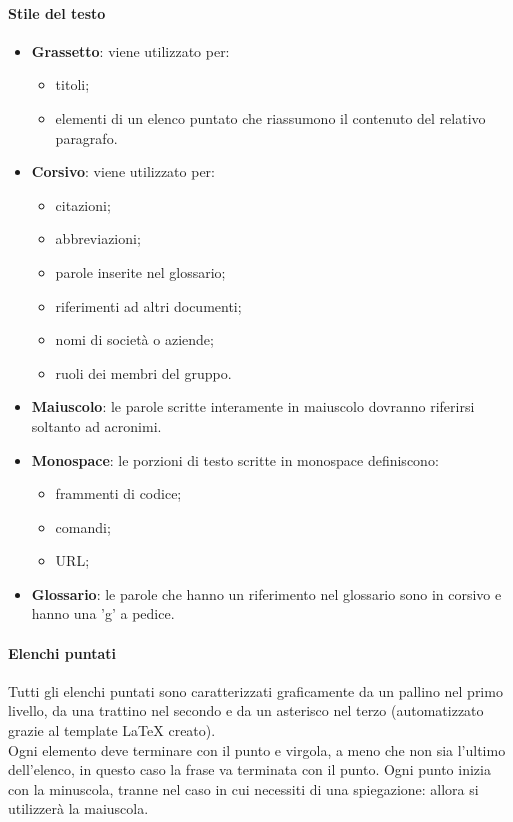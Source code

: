  \paragraph{Stile del testo} 
\begin{itemize}
	\item \textbf{Grassetto}: viene utilizzato per:
	\begin{itemize}
		\item titoli;
		\item elementi di un elenco puntato che riassumono il contenuto del relativo paragrafo.
	\end{itemize}
	\item \textbf{Corsivo}: viene utilizzato per:
	\begin{itemize}
		\item citazioni;
		\item abbreviazioni;
		\item parole inserite nel glossario;
		\item riferimenti ad altri documenti;
		\item nomi di società o aziende;
		\item ruoli dei membri del gruppo.
	\end{itemize}
	\item \textbf{Maiuscolo}: le parole scritte interamente in maiuscolo dovranno riferirsi soltanto ad acronimi.
	\item \textbf{Monospace}: le porzioni di testo scritte in monospace definiscono:
	\begin{itemize}
		\item frammenti di codice;
		\item comandi;
		\item URL;
	\end{itemize}
	\item \textbf{Glossario}: le parole che hanno un riferimento nel glossario sono in corsivo e hanno una 'g' a pedice.
\end{itemize}
 \paragraph{Elenchi puntati}
Tutti gli elenchi puntati sono caratterizzati graficamente da un pallino nel primo livello, da una trattino nel secondo e da un asterisco nel terzo (automatizzato grazie al template \LaTeX{} creato). \\
Ogni elemento deve terminare con il punto e virgola, a meno che non sia l'ultimo dell'elenco, in questo caso la frase va terminata con il punto. Ogni punto inizia con la minuscola, tranne nel caso in cui necessiti di una spiegazione: allora
si utilizzerà la maiuscola.
